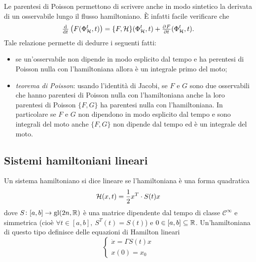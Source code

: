 Le parentesi di Poisson permettono di scrivere anche in modo sintetico la derivata di un osservabile lungo il flusso hamiltoniano. È infatti facile verificare che
\begin{equation}
    \od{}{t} \left(F(\Phi_\ham^t, t)\right) = \{F, \ham\}(\Phi_\ham^t, t) + \pd{F}{t}(\Phi_\ham^t, t).
\end{equation}
Tale relazione permette di dedurre i seguenti fatti:
\begin{itemize}
    \item se un'osservabile non dipende in modo esplicito dal tempo e ha perentesi di Poisson nulla con l'hamiltoniana allora è un integrale primo del moto;
    \item \emph{teorema di Poisson}: usando l'identità di Jacobi, se $ F $ e $ G $ sono due osservabili che hanno parentesi di Poisson nulla con l'hamiltoniana anche la loro parentesi di Poisson $ \{F, G\} $ ha parentesi nulla con l'hamiltoniana. In particolare se $ F $ e $ G $ non dipendono in modo esplicito dal tempo e sono integrali del moto anche $ \{F, G\} $ non dipende dal tempo ed è un integrale del moto.
\end{itemize}

\subsection{Sistemi hamiltoniani lineari}

\begin{definition}
    Un sistema hamiltoniano si dice lineare se l'hamiltoniana è una forma quadratica
    \begin{equation}
        \mathcal{H}(x, t) = \frac{1}{2} x^T \cdot S(t) x
    \end{equation}
    dove $ S \colon [a, b] \to \mathrm{gl}(2n, \mathbb{R}) $ è una matrice dipendente dal tempo di classe $ \mathcal{C}^\infty $ e simmetrica (cioè $ \forall t \in [a, b], \ S^T(t) = S(t) $) e $ 0 \in [a, b] \subseteq \mathbb{R} $. Un'hamiltoniana di questo tipo definisce delle equazioni di Hamilton lineari
    \begin{equation} \label{eqn:ham-lineare}
        \begin{cases}
            \dot{x} = \Gamma S(t) x \\
            x(0) = x_0
        \end{cases}
    \end{equation}
\end{definition}
\ \\

